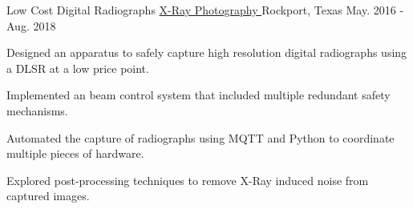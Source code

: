 \begin{cventries}
  \cventry
    {Low Cost Digital Radiographs} %
		{
			\href{https://github.com/TidalPaladin/xray-controller.git}
			{X-Ray Photography \faGithubSquare}
		} %
    {Rockport, Texas} %
    {May. 2016 - Aug. 2018} %
	{
	\begin{cvitems}
		\item {
			Designed an apparatus to safely capture high resolution
			digital radiographs using a DLSR at a low price point.
		}
		\item {
			Implemented an beam control system that included multiple
			redundant safety mechanisms.
		}
		\item {
			Automated the capture of radiographs using MQTT and Python
			to coordinate multiple pieces of hardware.
		}
		\item {
			Explored post-processing techniques to remove X-Ray induced
			noise from captured images.
		}
	\end{cvitems}
	}
\end{cventries}
